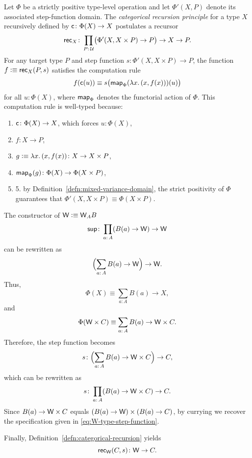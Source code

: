 \begin{defn}\label{defn:categorical-recursion}
    Let $\Phi$ be a strictly positive type-level operation and let $\Phi'(X,P)$ denote its associated step-function domain. The \textsl{categorical recursion principle} for a type $X$ recursively defined by $\fun c\colon\Phi(X)\to X$ postulates a recursor
    \[
        \fun{rec}_X\colon
            \prod_{P\colon\univ}
                \bigl(
                    \Phi'(X,X\times P)\to P
                \bigr)
                \to X\to P.
    \]
    For any target type $P$ and step function $s\colon\Phi'(X,X\times P)\to P$, the function $f\mathrel{\vcentcolon}\equiv\mathsf{rec}_X(P,s)$ satisfies the computation rule
    \begin{equation}\label{eq:categorical-computation-rule}
        f(\mathsf{c}(u))\equiv s
            \bigl(
                \mathsf{map}_\Phi
                    (\lambda x.\,(x,f(x)))(u)
            \bigr)
    \end{equation}
    for all $u\colon\Phi(X)$, where $\mathsf{map}_\Phi$ denotes the functorial action of $\Phi$. This computation rule is well-typed because:
    \begin{enumerate}[1.,font=\small]
        \item $\fun c\colon\Phi(X)\to X$, which forces $u\colon\Phi(X)$,
        \item $f\colon X\to P$,
        \item $g\defeq\lambda x.\,(x,f(x))\colon X\to X\times P$,
        \item $\fun{map}_\Phi(g)\colon\Phi(X)\to\Phi(X\times P)$,
        \item 5. by Definition~\ref{defn:mixed-variance-domain}, the strict positivity of $\Phi$ guarantees that $\Phi'(X,X\times P)\equiv\Phi(X\times P)$.
    \end{enumerate}
\end{defn}

\begin{xmpl}
    The constructor of $\mathsf{W}\mathrel{\vcentcolon}\equiv\mathsf{W}_AB$
    \[
        \fun{sup}\colon\prod_{a\colon A}
            (B(a)\to\fun W)\to\fun W
    \]
    can be rewritten as
    \[
        \Bigl(
            \sum_{a\colon A}B(a)\to\fun W
        \Bigr)
        \to\fun W.
    \]
    Thus,
    \[
        \Phi(X)\equiv\sum_{a\colon A}B(a)\to X,
    \]
    and
    \[
        \Phi(\fun W\times C)
            \equiv\sum_{a\colon A}
                B(a)\to\fun W\times C.
    \]
    Therefore, the step function becomes
    \[
        s\colon\Bigl(\sum_{a\colon A}
            B(a)\to\fun W\times C\Bigr)\to C,
    \]
    which can be rewritten as
    \[
        s\colon\prod_{a\colon A}
            (B(a)\to\fun W\times C)\to C.
    \]
    Since $B(a)\to\mathsf{W}\times C$ equals $(B(a)\to\mathsf{W})\times(B(a)\to C)$, by currying we recover the specification given in \eqref{eq:W-type-step-function}.

    Finally, Definition~\ref{defn:categorical-recursion} yields
    \[
        \fun{rec}_{\fun W}(C,s)\colon\fun W\to C.
    \]
\end{xmpl}

